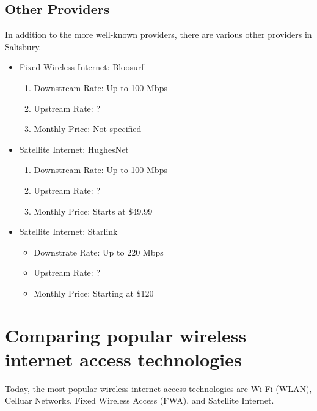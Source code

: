 \documentclass{article}
\begin{document}
\subsection{Other Providers}
In addition to the more well-known providers, there are various other providers in Salisbury.
\begin{itemize}
    \item Fixed Wireless Internet: Bloosurf \begin{enumerate}
        \item Downstream Rate: Up to 100 Mbps
        \item Upstream Rate: ?
        \item Monthly Price: Not specified
    \end{enumerate}
    \item Satellite Internet: HughesNet \begin{enumerate}
        \item Downstream Rate: Up to 100 Mbps
        \item Upstream Rate: ?
        \item Monthly Price: Starts at \$49.99
    \end{enumerate}
    \item Satellite Internet: Starlink \begin{itemize}
        \item Downstrate Rate: Up to 220 Mbps
        \item Upstream Rate: ?
        \item Monthly Price: Starting at \$120
    \end{itemize}
\end{itemize}

\setcounter{section}{9}
\section{Comparing popular wireless internet access technologies}
Today, the most popular wireless internet access technologies are Wi-Fi (WLAN), Celluar Networks, Fixed Wireless Access (FWA), and Satellite Internet.
\end{document}
